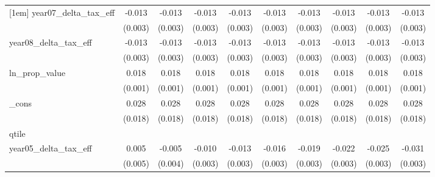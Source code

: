 {\begin{tabular}{l*{9}{c}}
[1em]
year07\_delta\_tax\_eff&      -0.013\sym{***}&      -0.013\sym{***}&      -0.013\sym{***}&      -0.013\sym{***}&      -0.013\sym{***}&      -0.013\sym{***}&      -0.013\sym{***}&      -0.013\sym{***}&      -0.013\sym{***}\\
            &     (0.003)         &     (0.003)         &     (0.003)         &     (0.003)         &     (0.003)         &     (0.003)         &     (0.003)         &     (0.003)         &     (0.003)         \\
[1em]
year08\_delta\_tax\_eff&      -0.013\sym{***}&      -0.013\sym{***}&      -0.013\sym{***}&      -0.013\sym{***}&      -0.013\sym{***}&      -0.013\sym{***}&      -0.013\sym{***}&      -0.013\sym{***}&      -0.013\sym{***}\\
            &     (0.003)         &     (0.003)         &     (0.003)         &     (0.003)         &     (0.003)         &     (0.003)         &     (0.003)         &     (0.003)         &     (0.003)         \\
[1em]
ln\_prop\_value&       0.018\sym{***}&       0.018\sym{***}&       0.018\sym{***}&       0.018\sym{***}&       0.018\sym{***}&       0.018\sym{***}&       0.018\sym{***}&       0.018\sym{***}&       0.018\sym{***}\\
            &     (0.001)         &     (0.001)         &     (0.001)         &     (0.001)         &     (0.001)         &     (0.001)         &     (0.001)         &     (0.001)         &     (0.001)         \\
[1em]
\_cons      &       0.028         &       0.028         &       0.028         &       0.028         &       0.028         &       0.028         &       0.028         &       0.028         &       0.028         \\
            &     (0.018)         &     (0.018)         &     (0.018)         &     (0.018)         &     (0.018)         &     (0.018)         &     (0.018)         &     (0.018)         &     (0.018)         \\
\hline
qtile       &                     &                     &                     &                     &                     &                     &                     &                     &                     \\
year05\_delta\_tax\_eff&       0.005         &      -0.005         &      -0.010\sym{***}&      -0.013\sym{***}&      -0.016\sym{***}&      -0.019\sym{***}&      -0.022\sym{***}&      -0.025\sym{***}&      -0.031\sym{***}\\
            &     (0.005)         &     (0.004)         &     (0.003)         &     (0.003)         &     (0.003)         &     (0.003)         &     (0.003)         &     (0.003)         &     (0.003)         \\

\end{tabular}}
